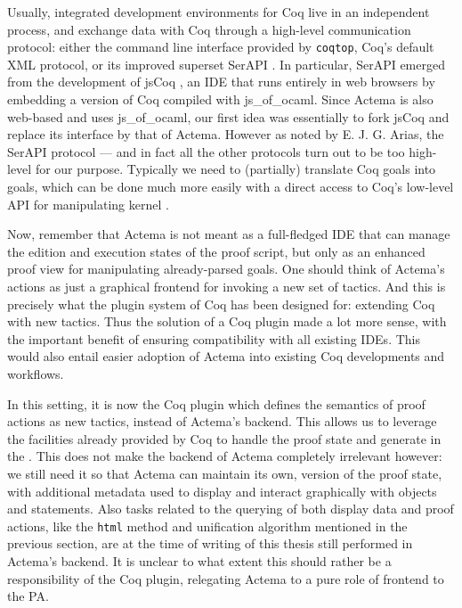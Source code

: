 Usually, integrated development environments for Coq live in an independent
process, and exchange data with Coq through a high-level communication protocol:
either the command line interface provided by \texttt{coqtop}, Coq's default XML
protocol, or its improved superset SerAPI .
In particular, SerAPI emerged from the development of jsCoq
, an IDE that runs entirely in web browsers by
embedding a version of Coq compiled with js\_of\_ocaml. Since Actema is also
web-based and uses js\_of\_ocaml, our first idea was essentially to fork jsCoq
and replace its interface by that of Actema. However as noted by E. J. G. Arias,
the SerAPI protocol --- and in fact all the other protocols turn out to be too
high-level for our purpose. Typically we need to (partially) translate Coq goals
into  goals, which can be done much more easily with a direct access to
Coq's low-level API for manipulating kernel .

Now, remember that Actema is not meant as a full-fledged IDE that can manage the
edition and execution states of the proof script, but only as an enhanced proof
view for manipulating already-parsed goals. One should think of Actema's actions
as just a graphical frontend for invoking a new set of tactics. And this is
precisely what the plugin system of Coq has been designed for: extending Coq
with new tactics. Thus the solution of a Coq plugin made a lot more sense, with
the important benefit of ensuring compatibility with all existing IDEs. This
would also entail easier adoption of Actema into existing Coq developments and
workflows.

In this setting, it is now the Coq plugin which defines the semantics of proof
actions as new tactics, instead of Actema's backend. This allows us to leverage
the facilities already provided by Coq to handle the proof state and generate
 in the . This does not
make the backend of Actema completely irrelevant however: we still need it so
that Actema can maintain its own,  version of the proof state,
with additional metadata used to display and interact graphically with objects
and statements. Also tasks related to the querying of both display data and
proof actions, like the \texttt{html} method and unification algorithm mentioned
in the previous section, are at the time of writing of this thesis still
performed in Actema's backend. It is unclear to what extent this should rather
be a responsibility of the Coq plugin, relegating Actema to a pure role of
frontend to the PA.

